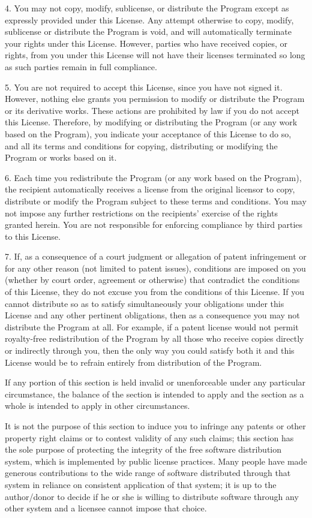 4. You may not copy, modify, sublicense, or distribute the Program except as expressly provided under this License. Any attempt otherwise to copy, modify, sublicense or distribute the Program is void, and will automatically terminate your rights under this License. However, parties who have received copies, or rights, from you under this License will not have their licenses terminated so long as such parties remain in full compliance.

5. You are not required to accept this License, since you have not signed it. However, nothing else grants you permission to modify or distribute the Program or its derivative works. These actions are prohibited by law if you do not accept this License. Therefore, by modifying or distributing the Program (or any work based on the Program), you indicate your acceptance of this License to do so, and all its terms and conditions for copying, distributing or modifying the Program or works based on it.

6. Each time you redistribute the Program (or any work based on the Program), the recipient automatically receives a license from the original licensor to copy, distribute or modify the Program subject to these terms and conditions. You may not impose any further restrictions on the recipients' exercise of the rights granted herein. You are not responsible for enforcing compliance by third parties to this License.

7. If, as a consequence of a court judgment or allegation of patent infringement or for any other reason (not limited to patent issues), conditions are imposed on you (whether by court order, agreement or otherwise) that contradict the conditions of this License, they do not excuse you from the conditions of this License. If you cannot distribute so as to satisfy simultaneously your obligations under this License and any other pertinent obligations, then as a consequence you may not distribute the Program at all. For example, if a patent license would not permit royalty-free redistribution of the Program by all those who receive copies directly or indirectly through you, then the only way you could satisfy both it and this License would be to refrain entirely from distribution of the Program.

If any portion of this section is held invalid or unenforceable under any particular circumstance, the balance of the section is intended to apply and the section as a whole is intended to apply in other circumstances.

It is not the purpose of this section to induce you to infringe any patents or other property right claims or to contest validity of any such claims; this section has the sole purpose of protecting the integrity of the free software distribution system, which is implemented by public license practices. Many people have made generous contributions to the wide range of software distributed through that system in reliance on consistent application of that system; it is up to the author/donor to decide if he or she is willing to distribute software through any other system and a licensee cannot impose that choice.

